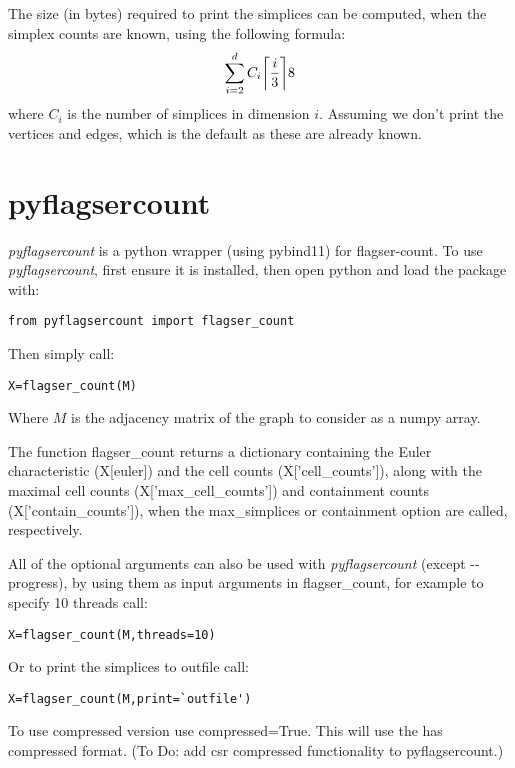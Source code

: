 \documentclass{amsart}
\theoremstyle{definition}
\let\originalleft\left
\let\originalright\right
\renewcommand{\left}{\mathopen{}\mathclose\bgroup\originalleft}
\renewcommand{\right}{\aftergroup\egroup\originalright}
\begin{document}
The size (in bytes) required to print the simplices can be computed, when the simplex counts are known, using the following formula:
$$ \sum_{i=2}^{d}C_i\left\lceil\frac{i}{3}\right\rceil8$$
where $C_i$ is the number of simplices in dimension $i$. Assuming we don't print the vertices and edges, which is the default as these are already known.

\section{pyflagsercount}
\textit{pyflagsercount} is a python wrapper (using pybind11) for flagser-count.
To use \textit{pyflagsercount}, first ensure it is installed, then open python and load the package with:
\begin{verbatim}from pyflagsercount import flagser_count\end{verbatim}
Then simply call:
\begin{verbatim}X=flagser_count(M)\end{verbatim}
Where $M$ is the adjacency matrix of the graph to consider as a numpy array.

The function flagser\_count returns a dictionary containing the Euler characteristic (X[euler]) and the cell counts (X['cell\_counts']), along with the maximal cell counts (X['max\_cell\_counts']) and containment counts (X['contain\_counts']), when the max\_simplices or containment option are called, respectively.

All of the optional arguments can also be used with \textit{pyflagsercount} (except -{}-progress), by using them as input arguments in flagser\_count, for example to specify 10 threads call:
\begin{verbatim}X=flagser_count(M,threads=10)\end{verbatim}
Or to print the simplices to outfile call:
\begin{verbatim}X=flagser_count(M,print=`outfile')\end{verbatim}

To use compressed version use compressed=True. This will use the has compressed format. (To Do: add csr compressed functionality to pyflagsercount.)
\end{document}
